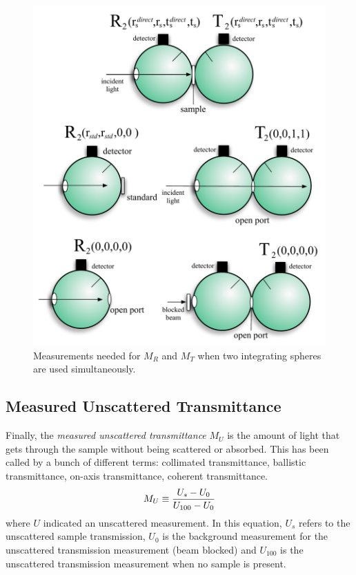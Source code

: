 \documentclass{article}
\begin{document}
\begin{figure}[!b]
\begin{center}                                                            
\includegraphics[scale=0.45]{ch3Doublespheres.pdf}
\caption{Measurements needed for $M_R$ and $M_T$ when two integrating spheres are used
simultaneously.}
\label{doublesphere}
\end{center}
\end{figure}

\subsection{Measured Unscattered Transmittance}

Finally, the \textit{measured unscattered transmittance} $M_U$ is the amount of light
that gets through the sample without being scattered or absorbed.
This
has been called by a bunch of different terms: collimated transmittance,
ballistic transmittance, on-axis transmittance, coherent transmittance.
\begin{equation}
M_U \equiv {U_s - U_0    \over 
            U_{100} - U_0 }
\label{eqmu}
\end{equation}
where $U$ indicated an unscattered measurement.  
In this equation, $U_s$ refers to the unscattered sample transmission,
$U_0$ is the background measurement for the unscattered transmission measurement
(beam blocked) and $U_{100}$ is the unscattered transmission measurement 
when no sample is present.
\end{document}
